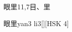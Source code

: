 \begin{entry}{眼里}{11,7}{⽬、⾥}
  \begin{phonetics}{眼里}{yan3 li3}[][HSK 4]
  \end{phonetics}
\end{entry}
